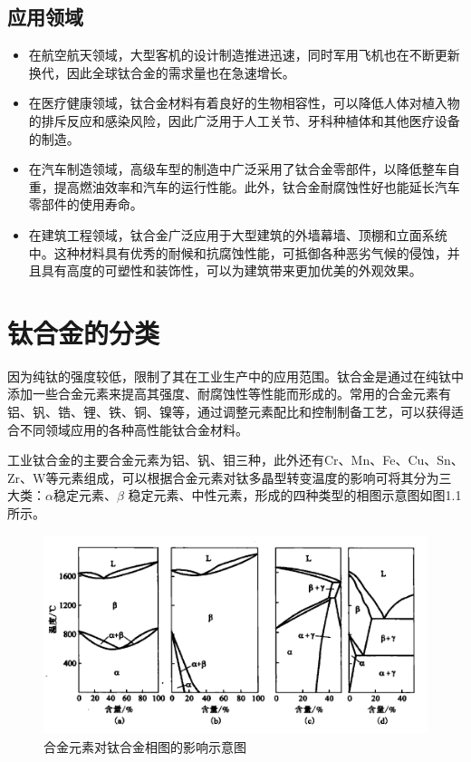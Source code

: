 \subsection{应用领域}

\begin{itemize}
\item  在航空航天领域，大型客机的设计制造推进迅速，同时军用飞机也在不断更新换代，因此全球钛合金的需求量也在急速增长。
\item  在医疗健康领域，钛合金材料有着良好的生物相容性，可以降低人体对植入物的排斥反应和感染风险，因此广泛用于人工关节、牙科种植体和其他医疗设备的制造。
\item  在汽车制造领域，高级车型的制造中广泛采用了钛合金零部件，以降低整车自重，提高燃油效率和汽车的运行性能。此外，钛合金耐腐蚀性好也能延长汽车零部件的使用寿命。
\item  在建筑工程领域，钛合金广泛应用于大型建筑的外墙幕墙、顶棚和立面系统中。这种材料具有优秀的耐候和抗腐蚀性能，可抵御各种恶劣气候的侵蚀，并且具有高度的可塑性和装饰性，可以为建筑带来更加优美的外观效果。

\end{itemize}
\section{钛合金的分类}
\label{sec:1.1}
因为纯钛的强度较低，限制了其在工业生产中的应用范围。钛合金是通过在纯钛中添加一些合金元素来提高其强度、耐腐蚀性等性能而形成的。常用的合金元素有铝、钒、锆、锂、铁、铜、镍等，通过调整元素配比和控制制备工艺，可以获得适合不同领域应用的各种高性能钛合金材料。

工业钛合金的主要合金元素为铝、钒、钼三种，此外还有Cr、Mn、Fe、Cu、Sn、Zr、W等元素组成，可以根据合金元素对钛多晶型转变温度的影响可将其分为三大类：$\alpha$稳定元素、$\beta$ 稳定元素、中性元素，形成的四种类型的相图示意图如图1.1所示。
\begin{figure}[h!]
	\centering
	\includegraphics[width=0.9\linewidth]{pic/01}
	\caption{合金元素对钛合金相图的影响示意图}
	\label{fig:01}
\end{figure}

